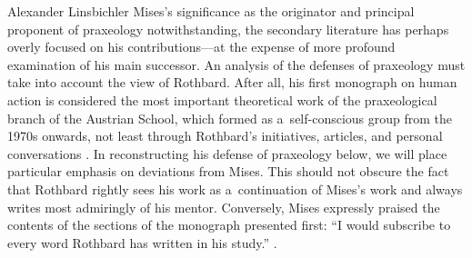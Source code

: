 \begin{artengenv}{Alexander Linsbichler}
Mises's significance as the originator and principal proponent of praxeology notwithstanding, the secondary literature has perhaps overly focused on his contributions---at the expense of more profound examination of his main successor. An analysis of the defenses of praxeology must take into account the view of Rothbard. After all, his first monograph on human action 
\parencites[][]{rothbard_man_1962}[][]{rothbard_man_2009} %
 is considered the most important theoretical work of the praxeological branch of the Austrian School, which formed as a~self-conscious group from the 1970s onwards, not least through Rothbard's initiatives, articles, and personal conversations 
\parencites[][pp.122–124]{gordon_essential_2007}[][]{holcombe_advanced_2014}[][]{rockwell__jr_murray_2010}[][]{white_methodology_1977}[][pp.26–27]{white_methodology_2003}. %
 In reconstructing his defense of praxeology below, we will place particular emphasis on deviations from Mises. This should not obscure the fact that Rothbard rightly sees his work as a~continuation of Mises's work and always writes most admiringly of his mentor. Conversely, Mises expressly praised the contents of the sections of the monograph presented first: ``I would subscribe to every word Rothbard has written in his study.'' 
\parencites[see][p.158]{mises_my_1976}[cf. also][p.2]{gordon_who_2008}.%





\end{artengenv}
